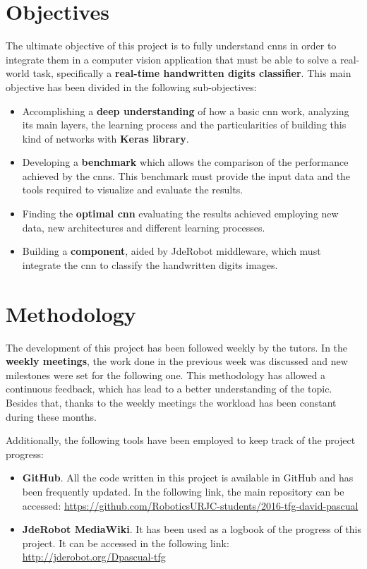 \section{Objectives}\label{sec:objectives}
The ultimate objective of this project is to fully understand \glspl{cnn} in order to integrate them in a computer vision application that must be able to solve a real-world task, specifically a \textbf{real-time handwritten digits classifier}. This main objective has been divided in the following sub-objectives: 
\begin{itemize}
	\item Accomplishing a \textbf{deep understanding} of how a basic \gls{cnn} work, analyzing its main layers, the learning process and the particularities of building this kind of networks with \textbf{Keras library}.
	\item Developing a \textbf{benchmark} which allows the comparison of the performance achieved by the \glspl{cnn}. This benchmark must provide the input data and the tools required to visualize and evaluate the results.
	\item Finding the \textbf{optimal \gls{cnn}} evaluating the results achieved employing new data, new architectures and different learning processes.
	\item Building a \textbf{component}, aided by JdeRobot middleware, which must integrate the \gls{cnn} to classify the handwritten digits images.
\end{itemize}

\section{Methodology}
The development of this project has been followed weekly by the tutors. In the \textbf{weekly meetings}, the work done in the previous week was discussed and new milestones were set for the following one. This methodology has allowed a continuous feedback, which has lead to a better understanding of the topic. Besides that, thanks to the weekly meetings the workload has been constant during these months. 

Additionally, the following tools have been employed to keep track of the project progress:
\begin{itemize}
	\item \textbf{GitHub}. All the code written in this project is available in GitHub and has been  frequently updated. In the following link, the main repository can be accessed:
	\url{https://github.com/RoboticsURJC-students/2016-tfg-david-pascual}
	\item \textbf{JdeRobot MediaWiki}. It has been used as a logbook of the progress of this project. It can be accessed in the following link:
	\url{http://jderobot.org/Dpascual-tfg}
\end{itemize}

